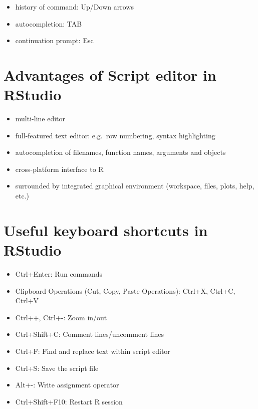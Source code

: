\documentclass[
]{book}
\providecommand{\tightlist}{%
  \setlength{\itemsep}{0pt}\setlength{\parskip}{0pt}}
\begin{document}
\begin{itemize}
\tightlist
\item
  history of command: Up/Down arrows
\item
  autocompletion: TAB
\item
  continuation prompt: Esc
\end{itemize}

\hypertarget{advantages-of-script-editor-in-rstudio}{%
\section{Advantages of Script editor in RStudio}\label{advantages-of-script-editor-in-rstudio}}

\begin{itemize}
\tightlist
\item
  multi-line editor
\item
  full-featured text editor: e.g.~row numbering, syntax highlighting
\item
  autocompletion of filenames, function names, arguments and objects
\item
  cross-platform interface to R
\item
  surrounded by integrated graphical environment (workspace, files, plots, help, etc.)
\end{itemize}

\hypertarget{useful-keyboard-shortcuts-in-rstudio}{%
\section{Useful keyboard shortcuts in RStudio}\label{useful-keyboard-shortcuts-in-rstudio}}

\begin{itemize}
\tightlist
\item
  Ctrl+Enter: Run commands
\item
  Clipboard Operations (Cut, Copy, Paste Operations): Ctrl+X, Ctrl+C, Ctrl+V
\item
  Ctrl++, Ctrl+-: Zoom in/out
\item
  Ctrl+Shift+C: Comment lines/uncomment lines
\item
  Ctrl+F: Find and replace text within script editor
\item
  Ctrl+S: Save the script file
\item
  Alt+-: Write assignment operator
\item
  Ctrl+Shift+F10: Restart R session
\end{itemize}
\end{document}

